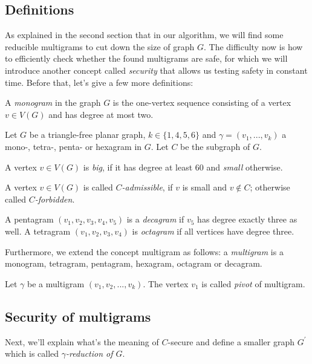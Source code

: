 \subsection{Definitions}
As explained in the second section that in our algorithm, we will find some reducible multigrams to cut down the size of graph $G$. The difficulty now is how to efficiently check whether the found multigrams are safe, for which we will introduce another concept called \textit{security} that allows us testing safety in constant time. Before that, let's give a few more definitions:
\begin{definition}
A \textit{monogram} in the graph $G$ is the one-vertex sequence consisting of a vertex $v \in V(G)$ and has degree at most two. \cite{dvorak2013threecoloring} 
\end{definition}
Let $G$ be a triangle-free planar graph, $k \in \{1, 4, 5, 6\}$ and $\gamma = (v_1, ..., v_k)$ a mono-, tetra-, penta- or hexagram in $G$. Let $C$ be the subgraph of $G$.

\begin{definition}
A vertex $v \in V(G)$ is \textit{big}, if it has degree at least 60 and \textit{small} otherwise. \cite{dvorak2013threecoloring}
\end{definition}

\begin{definition}
A vertex $v \in V(G)$ is called \textit{$C$-admissible}, if $v$ is small and $v \notin C$; otherwise called \textit{$C$-forbidden}. \cite{dvorak2013threecoloring} 
\end{definition}

\begin{definition}
A pentagram $(v_1, v_2, v_3, v_4, v_5)$ is a \textit{decagram} if $v_5$ has degree exactly three as well. A tetragram $(v_1, v_2, v_3, v_4)$ is \textit{octagram} if all vertices have degree three. \cite{dvorak2013threecoloring}
\end{definition}
Furthermore, we extend the concept multigram as follows: a \textit{multigram} is a monogram, tetragram, pentagram, hexagram, octagram or decagram.

\begin{definition}
Let $\gamma$ be a multigram $(v_1, v_2, ..., v_k)$. The vertex $v_1$ is called \textit{pivot} of multigram. \cite{dvorak2013threecoloring}
\end{definition}
\subsection{Security of multigrams}
Next, we'll explain what's the meaning of $C$-secure and define a smaller graph $G^{'}$ which is called \textit{$\gamma$-reduction of $G$}.

